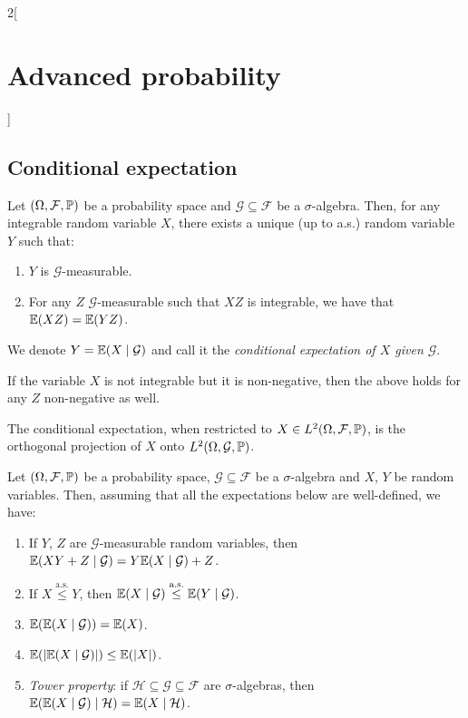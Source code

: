 \documentclass[../../../main_math.tex]{subfiles}
\begin{document}
\begin{multicols}{2}[\section{Advanced probability}]
  \subsection{Conditional expectation}
  \begin{proposition}
    Let $(\Omega,\mathcal{F},\mathbb{P})$ be a probability space and $\mathcal{G}\subseteq \mathcal{F}$ be a $\sigma$-algebra. Then, for any integrable random variable $X$, there exists a unique (up to a.s.) random variable $Y$ such that:
    \begin{enumerate}
      \item $Y$ is $\mathcal{G}$-measurable.
      \item For any $Z$ $\mathcal{G}$-measurable such that $XZ$ is integrable, we have that $\mathbb{E}(XZ)=\mathbb{E}(YZ)$.
    \end{enumerate}
    We denote $Y=\mathbb{E}(X\mid \mathcal{G})$ and call it the \emph{conditional expectation of $X$ given $\mathcal{G}$}.
  \end{proposition}
  \begin{remark}
    If the variable $X$ is not integrable but it is non-negative, then the above holds for any $Z$ non-negative as well.
  \end{remark}
  \begin{remark}
    The conditional expectation, when restricted to $X\in L^2(\Omega,\mathcal{F},\mathbb{P})$, is the orthogonal projection of $X$ onto $L^2(\Omega,\mathcal{G},\mathbb{P})$.
  \end{remark}
  \begin{proposition}
    Let $(\Omega,\mathcal{F},\mathbb{P})$ be a probability space, $\mathcal{G}\subseteq \mathcal{F}$ be a $\sigma$-algebra and $X$, $Y$ be random variables. Then, assuming that all the expectations below are well-defined, we have:
    \begin{enumerate}
      \item If $Y$, $Z$ are $\mathcal{G}$-measurable random variables, then $\mathbb{E}(XY+Z\mid \mathcal{G})=Y\mathbb{E}(X\mid \mathcal{G})+Z$.
      \item If $X\overset{\text{a.s.}}{\leq} Y$, then $\mathbb{E}(X\mid \mathcal{G})\overset{\text{a.s.}}{\leq} \mathbb{E}(Y\mid \mathcal{G})$.
      \item $\mathbb{E}(\mathbb{E}(X\mid \mathcal{G}))=\mathbb{E}(X)$.
      \item $\mathbb{E}(\abs{\mathbb{E}(X\mid \mathcal{G})})\leq \mathbb{E}(\abs{X})$.
      \item \emph{Tower property}: if $\mathcal{H}\subseteq \mathcal{G}\subseteq \mathcal{F}$ are $\sigma$-algebras, then $\mathbb{E}(\mathbb{E}(X\mid \mathcal{G})\mid \mathcal{H})=\mathbb{E}(X\mid \mathcal{H})$.

\end{enumerate}
\end{proposition}
\end{multicols}
\end{document}
